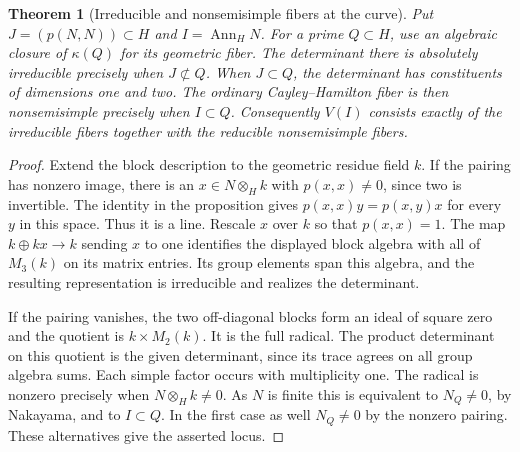 \documentclass[a4paper,11pt]{article}
\newtheorem{theorem}[proposition]{Theorem}
\theoremstyle{definition}
\theoremstyle{remark}
\numberwithin{equation}{section}
\begin{document}
\begin{theorem}[Irreducible and nonsemisimple fibers at the curve]\leavevmode
\label{thm:oddsupport410}
Put \(J=(p(N,N))\subset H\) and \(I=\operatorname{Ann}_H N\).
For a prime \(Q\subset H\), use an algebraic closure of
\(\kappa(Q)\) for its geometric fiber. The determinant there
is absolutely irreducible precisely when \(J\not\subset Q\).
When \(J\subset Q\), the determinant has constituents of
dimensions one and two. The ordinary Cayley--Hamilton
fiber is then nonsemisimple precisely when \(I\subset Q\).
Consequently \(V(I)\) consists exactly of the irreducible
fibers together with the reducible nonsemisimple fibers.
\end{theorem}
\begin{proof}
Extend the block description to the geometric residue
field \(k\). If the pairing has nonzero image, there is an
\(x\in N\otimes_H k\) with \(p(x,x)\ne0\), since two is
invertible. The identity in the proposition gives
\(p(x,x)y=p(x,y)x\) for every \(y\) in this space. Thus it
is a line. Rescale \(x\) over \(k\) so that \(p(x,x)=1\).
The map \(k\oplus kx\to k\) sending \(x\) to one identifies
the displayed block algebra with all of \(M_3(k)\) on its
matrix entries. Its group elements span this algebra,
and the resulting representation is irreducible and realizes
the determinant.

If the pairing vanishes, the two off-diagonal blocks form
an ideal of square zero and the quotient is \(k\times M_2(k)\).
It is the full radical. The product determinant on this
quotient is the given determinant, since its trace agrees
on all group algebra sums. Each simple factor occurs with
multiplicity one. The radical is nonzero precisely when
\(N\otimes_H k\ne0\). As \(N\) is finite this is equivalent
to \(N_Q\ne0\), by Nakayama, and to \(I\subset Q\). In the
first case as well \(N_Q\ne0\) by the nonzero pairing.
These alternatives give the asserted locus.
\end{proof}
\end{document}
